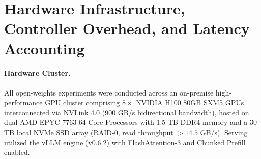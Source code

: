 \documentclass[11pt]{article}
\begin{document}
\section{Hardware Infrastructure, Controller Overhead, and Latency Accounting}
\label{app:hardware}

\paragraph{Hardware Cluster.}
All open-weights experiments were conducted across an on-premise high-performance GPU cluster comprising $8 \times$ NVIDIA H100 80GB SXM5 GPUs interconnected via NVLink 4.0 (900 GB/s bidirectional bandwidth), hosted on dual AMD EPYC 7763 64-Core Processors with 1.5 TB DDR4 memory and a 30 TB local NVMe SSD array (RAID-0, read throughput $> 14.5$ GB/s). Serving utilized the vLLM engine (v0.6.2) with FlashAttention-3 and Chunked Prefill enabled.

\begin{table}[h]
\centering
\small
{}
\vspace{-2mm}
\caption{\textbf{Computational Overhead and Resource Utilization of \textsc{GVoC} Decision Controller.} Evaluated across 5,000 steps on an AMD EPYC CPU and NVIDIA H100 GPU.}
\label{tab:controller_overhead}
\end{table}
\end{document}
